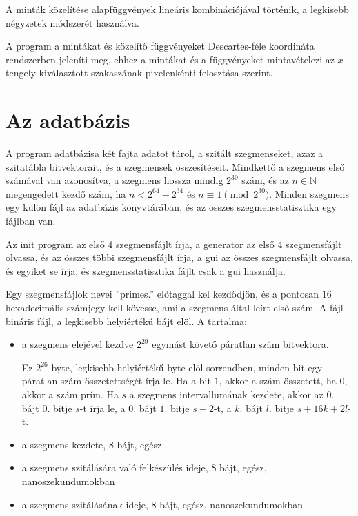 A minták közelítése alapfüggvények lineáris kombinációjával történik, a legkisebb négyzetek módszerét használva.

A program a mintákat és közelítő függvényeket Descartes-féle koordináta rendszerben jeleníti meg, ehhez a mintákat és a függvényeket mintavételezi az $x$ tengely kiválasztott szakaszának pixelenkénti felosztása szerint.

\section{Az adatbázis}

A program adatbázisa két fajta adatot tárol, a szitált szegmenseket, azaz a szitatábla bitvektorait, és a szegmensek összesítéseit.
Mindkettő a szegmens első számával van azonosítva, a szegmens hossza mindig $2^{30}$ szám, és az $n \in \mathbb{N}$ megengedett kezdő szám, ha $n < 2^{64}-2^{34}$ és $n \equiv 1 \pmod{2^{30}}$.
Minden szegmens egy külön fájl az adatbázis könyvtárában, és az összes szegmensstatisztika egy fájlban van.

Az init program az első 4 szegmensfájlt írja, a generator az első 4 szegmensfájlt olvassa, és az összes többi szegmensfájlt írja, a gui az összes szegmensfájlt olvassa, és egyiket se írja, és szegmensstatisztika fájlt csak a gui használja.

Egy szegmensfájlok nevei ''primes.'' előtaggal kel kezdődjön, és a pontosan 16 hexadecimális számjegy kell kövesse, ami a szegmens által leírt első szám.
A fájl bináris fájl, a legkisebb helyiértékű bájt elöl.  %
A tartalma:
\begin{itemize}
\item a szegmens elejével kezdve $2^{29}$ egymást követő páratlan szám bitvektora.
	
Ez $2^{26}$ byte, legkisebb helyiértékű byte elöl sorrendben, minden bit egy páratlan szám összetettségét írja le.
Ha a bit $1$, akkor a szám összetett, ha $0$, akkor a szám prím.
Ha $s$ a szegmens intervallumának kezdete, akkor az $0.$ bájt $0.$ bitje $s$-t írja le, a $0.$ bájt $1.$ bitje $s+2$-t, a $k.$ bájt $l.$ bitje $s+16k+2l$-t.
	
\item a szegmens kezdete, 8 bájt, egész
\item a szegmens szitálására való felkészülés ideje, 8 bájt, egész, nanoszekundumokban
\item a szegmens szitálásának ideje, 8 bájt, egész, nanoszekundumokban
\end{itemize}

